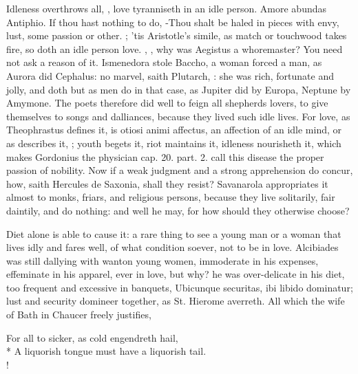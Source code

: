 Idleness overthrows all, , love tyranniseth in
an idle person. Amore abundas Antiphio. If thou hast nothing to
do, -Thou shalt be haled in
pieces with envy, lust, some passion or other. ; 'tis Aristotle's simile, as match or
touchwood takes fire, so doth an idle person love. , \etc{}, why was Aegistus a whoremaster? You need
not ask a reason of it. Ismenedora stole Baccho, a woman forced a man,
as Aurora did Cephalus: no marvel, saith Plutarch,
: she was rich, fortunate and
jolly, and doth but as men do in that case, as Jupiter did by Europa,
Neptune by Amymone. The poets therefore did well to feign all shepherds
lovers, to give themselves to songs and dalliances, because they lived
such idle lives. For love, as Theophrastus defines it, is otiosi
animi affectus, an affection of an idle mind, or as \Seneca{}
describes it, ; youth begets it, riot maintains it,
idleness nourisheth it, \etc{} which makes  Gordonius the physician
cap. 20. part. 2. call this disease the proper passion of nobility. Now
if a weak judgment and a strong apprehension do concur, how, saith
Hercules de Saxonia, shall they resist? Savanarola appropriates it
almost to monks, friars, and religious persons, because they live
solitarily, fair daintily, and do nothing: and well he may, for how
should they otherwise choose?

Diet alone is able to cause it: a rare thing to see a young man or a
woman that lives idly and fares well, of what condition soever, not to
be in love. Alcibiades was still dallying with wanton young
women, immoderate in his expenses, effeminate in his apparel, ever in
love, but why? he was over-delicate in his diet, too frequent and
excessive in banquets, Ubicunque securitas, ibi libido dominatur; lust
and security domineer together, as St. Hierome averreth. All which the
wife of Bath in Chaucer freely justifies,
%
{\gothfont%
\begin{versewithlinenos}{2}{1}{1}%
For all to sicker, as cold engendreth hail,\\*
A liquorish tongue must have a liquorish tail.\\!
\end{versewithlinenos}%
}%

